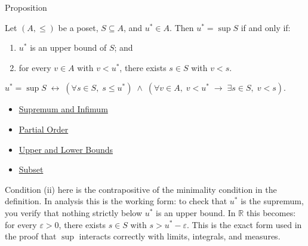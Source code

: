 
\begin{propositionbox}{Proposition}
\begin{proposition}
\label{prop:sup-char}
Let $(A, \leq)$ be a poset, $S \subseteq A$, and $u^* \in A$.  Then
$u^* = \sup S$ if and only if:
\begin{enumerate}[label=(\roman*)]
  \item $u^*$ is an upper bound of $S$; and
  \item for every $v \in A$ with $v < u^*$, there exists $s \in S$ with
        $v < s$.
\end{enumerate}
\end{proposition}
\end{propositionbox}

\begin{remark*}
$u^* = \sup S \;\leftrightarrow\; (\forall s \in S,\; s \leq u^*) \;\wedge\;
(\forall v \in A,\; v < u^* \;\rightarrow\; \exists s \in S,\; v < s)$.
\end{remark*}

\begin{dependencies}
\begin{itemize}
  \item \hyperref[def:sup-inf]{Supremum and Infimum}
  \item \hyperref[def:partial-order]{Partial Order}
  \item \hyperref[def:bounds]{Upper and Lower Bounds}
  \item \hyperref[def:subset]{Subset}
\end{itemize}
\end{dependencies}

\begin{remark*}
\label{rem:sup-char-utility}
Condition (ii) here is the contrapositive of the minimality condition in
the definition.  In analysis this is the working form: to check that
$u^*$ is the supremum, you verify that nothing strictly below $u^*$ is an
upper bound.  In $\mathbb{R}$ this becomes: for every $\varepsilon > 0$,
there exists $s \in S$ with $s > u^* - \varepsilon$.  This is the exact
form used in the proof that $\sup$ interacts correctly with limits,
integrals, and measures.
\end{remark*}

